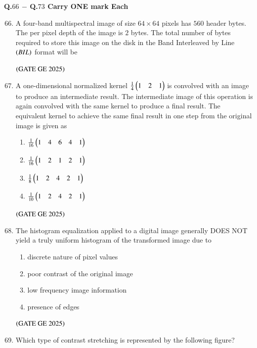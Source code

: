 \documentclass[journal,12pt,onecolumn]{IEEEtran}
\theoremstyle{remark}
\begin{document}
\textbf{Q.$66$ $-$ Q.$73$ Carry ONE mark Each}
\bigskip
\begin{enumerate}
\setcounter{enumi}{65}
\item A four-band multispectral image of size $64 \times 64$ pixels has $560$ header bytes.
The per pixel depth of the image is $2$ bytes.
The total number of bytes required to store this image on the disk in the Band Interleaved by Line $\left(BIL\right)$ format will be
\begin{enumerate}
\end{enumerate}
\hfill $\left(\text{GATE GE 2025}\right)$
\bigskip
\item A one-dimensional normalized kernel $\frac{1}{4}\begin{pmatrix}1 & 2 & 1\end{pmatrix}$ is convolved with an image to produce an intermediate result.
The intermediate image of this operation is again convolved with the same kernel to produce a final result.
The equivalent kernel to achieve the same final result in one step from the original image is given as
\begin{enumerate}
\item $\frac{1}{16}\begin{pmatrix}1 & 4 & 6 & 4 & 1\end{pmatrix}$
\item $\frac{1}{16}\begin{pmatrix}1 & 2 & 1 & 2 & 1\end{pmatrix}$
\item $\frac{1}{8}\begin{pmatrix}1 & 2 & 4 & 2 & 1\end{pmatrix}$
\item $\frac{1}{10}\begin{pmatrix}1 & 2 & 4 & 2 & 1\end{pmatrix}$
\end{enumerate}
\hfill $\left(\text{GATE GE 2025}\right)$
\bigskip
\item The histogram equalization applied to a digital image generally DOES NOT yield a truly uniform histogram of the transformed image due to
\begin{enumerate}
\item discrete nature of pixel values
\item poor contrast of the original image
\item low frequency image information
\item 
presence of edges
\end{enumerate}
\hfill $\left(\text{GATE GE 2025}\right)$
\bigskip
\item Which type of contrast stretching is represented by the following figure?\\

\end{enumerate}
\end{document}
